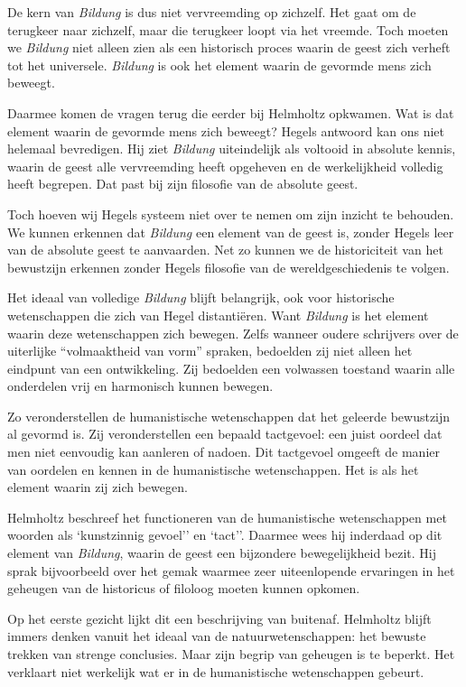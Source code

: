 De kern van \textit{Bildung} is dus niet vervreemding op zichzelf. Het gaat om de terugkeer naar zichzelf, maar die terugkeer loopt via het vreemde. Toch moeten we \textit{Bildung} niet alleen zien als een historisch proces waarin de geest zich verheft tot het universele. \textit{Bildung} is ook het element waarin de gevormde mens zich beweegt.

Daarmee komen de vragen terug die eerder bij Helmholtz opkwamen. Wat is dat element waarin de gevormde mens zich beweegt? Hegels antwoord kan ons niet helemaal bevredigen. Hij ziet \textit{Bildung} uiteindelijk als voltooid in absolute kennis, waarin de geest alle vervreemding heeft opgeheven en de werkelijkheid volledig heeft begrepen. Dat past bij zijn filosofie van de absolute geest.

Toch hoeven wij Hegels systeem niet over te nemen om zijn inzicht te behouden. We kunnen erkennen dat \textit{Bildung} een element van de geest is, zonder Hegels leer van de absolute geest te aanvaarden. Net zo kunnen we de historiciteit van het bewustzijn erkennen zonder Hegels filosofie van de wereldgeschiedenis te volgen.

Het ideaal van volledige \textit{Bildung} blijft belangrijk, ook voor historische wetenschappen die zich van Hegel distantiëren. Want \textit{Bildung} is het element waarin deze wetenschappen zich bewegen. Zelfs wanneer oudere schrijvers over de uiterlijke ``volmaaktheid van vorm'' spraken, bedoelden zij niet alleen het eindpunt van een ontwikkeling. Zij bedoelden een volwassen toestand waarin alle onderdelen vrij en harmonisch kunnen bewegen.

Zo veronderstellen de humanistische wetenschappen dat het geleerde bewustzijn al gevormd is. Zij veronderstellen een bepaald tactgevoel: een juist oordeel dat men niet eenvoudig kan aanleren of nadoen. Dit tactgevoel omgeeft de manier van oordelen en kennen in de humanistische wetenschappen. Het is als het element waarin zij zich bewegen.

Helmholtz beschreef het functioneren van de humanistische wetenschappen met woorden als `kunstzinnig gevoel'' en `tact''. Daarmee wees hij inderdaad op dit element van \textit{Bildung}, waarin de geest een bijzondere bewegelijkheid bezit. Hij sprak bijvoorbeeld over het gemak waarmee zeer uiteenlopende ervaringen in het geheugen van de historicus of filoloog moeten kunnen opkomen.

Op het eerste gezicht lijkt dit een beschrijving van buitenaf. Helmholtz blijft immers denken vanuit het ideaal van de natuurwetenschappen: het bewuste trekken van strenge conclusies. Maar zijn begrip van geheugen is te beperkt. Het verklaart niet werkelijk wat er in de humanistische wetenschappen gebeurt.

